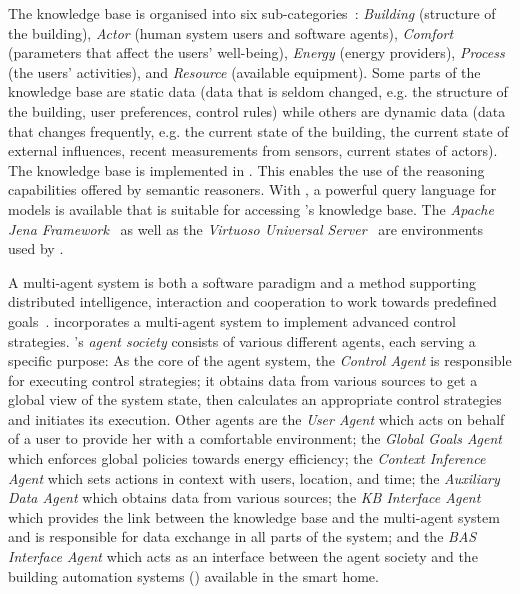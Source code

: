 The knowledge base is organised into six sub-categories~\cite{CR2011-TH_Journal,CR2010-DEST_ThinkHome}: \emph{Building} (structure of the building), \emph{Actor} (human system users and software agents), \emph{Comfort} (parameters that affect the users' well-being), \emph{Energy} (energy providers), \emph{Process} (the users' activities), and \emph{Resource} (available equipment). Some parts of the knowledge base are static data (data that is seldom changed, e.g. the structure of the building, user preferences, control rules) while others are dynamic data (data that changes frequently, e.g. the current state of the building, the current state of external influences, recent measurements from sensors, current states of actors). The knowledge base is implemented in . This enables the use of the reasoning capabilities offered by semantic reasoners. With , a powerful query language for  models is available that is suitable for accessing \thinkhome's knowledge base.
The \emph{Apache Jena Framework}~\cite{apache_jena} as well as the \emph{Virtuoso Universal Server}~\cite{virtuoso} are environments used by \thinkhome.

A multi-agent system is both a software paradigm and a method supporting distributed intelligence, interaction and cooperation to work towards predefined goals~\cite{MultiAgentSystems}. \thinkhome incorporates a multi-agent system to implement advanced control strategies. \thinkhome's \emph{agent society} consists of various different agents, each serving a specific purpose: As the core of the agent system, the \emph{Control Agent} is responsible for executing control strategies; it obtains data from various sources to get a global view of the system state, then calculates an appropriate control strategies and initiates its execution. Other agents are the \emph{User Agent} which acts on behalf of a user to provide her with a comfortable environment; the \emph{Global Goals Agent} which enforces global policies towards energy efficiency; the \emph{Context Inference Agent} which sets actions in context with users, location, and time; the \emph{Auxiliary Data Agent} which obtains data from various sources;
the \emph{KB Interface Agent} which provides the link between the knowledge base and the multi-agent system and is responsible for data exchange in all parts of the system; and the \emph{BAS Interface Agent} which acts as an interface between the agent society and the building automation systems () available in the smart home.


